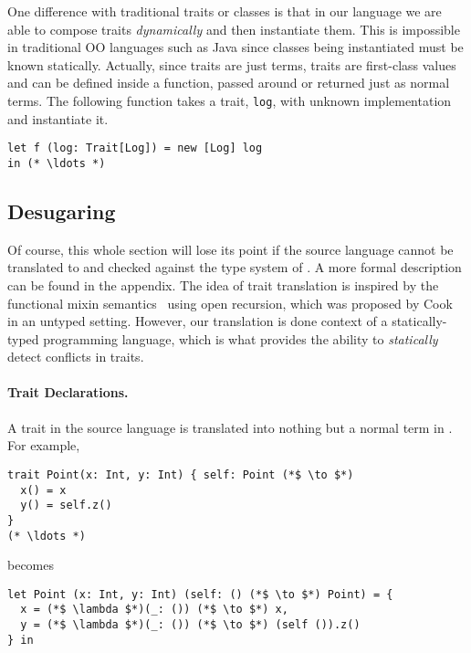 One difference with traditional traits or classes is that in our
language we are able to compose traits \emph{dynamically} and then instantiate
them. This is impossible in traditional OO languages such as Java since classes
being instantiated must be known statically. Actually, since traits are just
terms, traits are first-class values and can be defined inside a function,
passed around or returned just as normal terms. The following function takes a
trait, \lstinline$log$, with unknown implementation and instantiate it.

\begin{lstlisting}
let f (log: Trait[Log]) = new [Log] log
in (* \ldots *)
\end{lstlisting}


\subsection{Desugaring}

Of course, this whole section will lose its point if the source language cannot
be translated to \name and checked against the type system of \name. A more
formal description can be found in the appendix. The idea of trait translation
is inspired by the functional mixin
semantics~\cite{cook1989denotational} using open recursion, which was
proposed by Cook in an untyped setting. However, our translation is done context of a
statically-typed programming language, which is what provides the ability to \emph{statically}
detect conflicts in traits.

\paragraph{Trait Declarations.} A trait in the source language is translated into
nothing but a normal term in \name. For example,

\begin{lstlisting}
trait Point(x: Int, y: Int) { self: Point (*$ \to $*)
  x() = x
  y() = self.z()
}
(* \ldots *)
\end{lstlisting}

\noindent becomes

\begin{lstlisting}
let Point (x: Int, y: Int) (self: () (*$ \to $*) Point) = {
  x = (*$ \lambda $*)(_: ()) (*$ \to $*) x,
  y = (*$ \lambda $*)(_: ()) (*$ \to $*) (self ()).z()
} in
\end{lstlisting}

